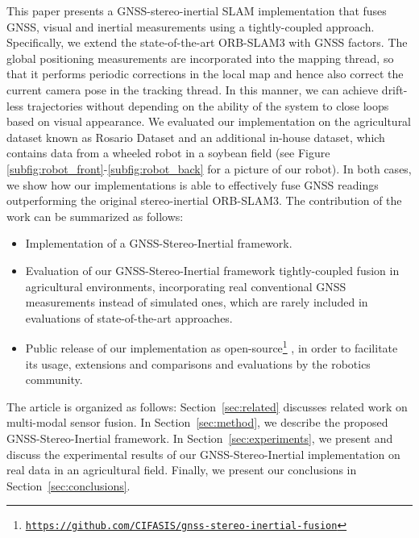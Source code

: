 This paper presents a GNSS-stereo-inertial SLAM implementation that fuses GNSS, visual and inertial measurements using a tightly-coupled approach. Specifically, we extend the state-of-the-art ORB-SLAM3 \cite{campos2021orbslam3} with GNSS factors. The global positioning measurements are incorporated into the mapping thread, so that it performs periodic corrections in the local map and hence also correct the current camera pose in the tracking thread. In this manner, we can achieve drift-less trajectories without depending on the ability of the system to close loops based on visual appearance. We evaluated our implementation on the agricultural dataset known as Rosario Dataset \cite{pire2019rosario} and an additional in-house dataset, which contains data from a wheeled robot in a soybean field (see Figure \ref{subfig:robot_front}-\ref{subfig:robot_back} for a picture of our robot). In both cases, we show how our implementations is able to effectively fuse GNSS readings outperforming the original stereo-inertial ORB-SLAM3. The contribution of the work can be summarized as follows:
\begin{itemize}
    \item Implementation of a GNSS-Stereo-Inertial framework.
    \item Evaluation of our GNSS-Stereo-Inertial framework tightly-coupled fusion in agricultural environments, incorporating real conventional GNSS measurements instead of simulated ones, which are rarely included in evaluations of state-of-the-art approaches.
    \item Public release of our implementation as open-source\footnote{\href{https://github.com/CIFASIS/gnss-stereo-inertial-fusion}{\nolinkurl{https://github.com/CIFASIS/gnss-stereo-inertial-fusion}}} , in order to facilitate its usage, extensions and comparisons and evaluations by the robotics community.
\end{itemize}

The article is organized as follows: Section~\ref{sec:related} discusses related work on multi-modal sensor fusion. In  Section~\ref{sec:method}, we describe the proposed GNSS-Stereo-Inertial framework. In Section~\ref{sec:experiments}, we present and discuss the experimental results of our GNSS-Stereo-Inertial implementation on real data in an agricultural field. Finally, we present our conclusions in Section~\ref{sec:conclusions}.
